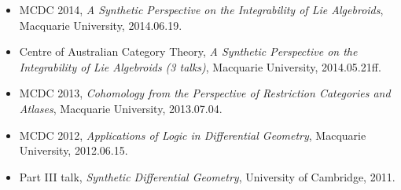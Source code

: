 \documentclass[10pt]{article}
\begin{document}
\begin{itemize}
    \item MCDC 2014, \emph{A Synthetic Perspective on the Integrability of Lie Algebroids}, Macquarie University, 2014.06.19.
    \item Centre of Australian Category Theory, \emph{A Synthetic Perspective on the Integrability of Lie Algebroids (3 talks)}, Macquarie University, 2014.05.21ff.
    \item MCDC 2013, \emph{Cohomology from the Perspective of Restriction Categories and Atlases}, Macquarie University, 2013.07.04.
    \item MCDC 2012, \emph{Applications of Logic in Differential Geometry}, Macquarie University, 2012.06.15.
    \item Part III talk, \emph{Synthetic Differential Geometry}, University of Cambridge, 2011.
\end{itemize}
\end{document}
